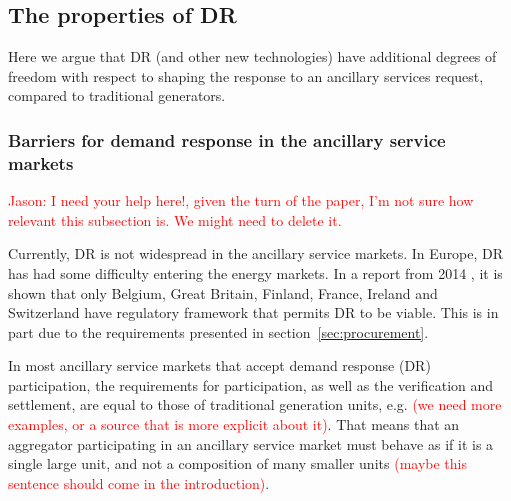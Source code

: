 
\subsection{The properties of DR}
Here we argue that DR (and other new technologies) have additional degrees of freedom with respect to shaping the response to an ancillary services request, compared to traditional generators.

\iffalse %

\subsubsection{Barriers for demand response in the ancillary service markets}\label{sec:drinasm}
\textcolor{red}{Jason: I need your help here!, given the turn of the paper, I'm not sure how relevant this subsection is. We might need to delete it.}

Currently, DR is not widespread in the ancillary service markets. In Europe, DR has had some difficulty entering the energy markets. In a report from 2014 \cite{sedc2014mapping}, it is shown that only Belgium, Great Britain, Finland, France, Ireland and Switzerland have regulatory framework that permits DR to be viable. This is in part due to the requirements presented in section~\ref{sec:procurement}.

In most ancillary service markets that accept demand response (DR) participation, the requirements for participation, as well as the verification and settlement, are equal to those of traditional generation units, e.g. \cite{energinet2012ancillary} \textcolor{red}{(we need more examples, or a source that is more explicit about it)}. That means that an aggregator participating in an ancillary service market must behave as if it is a single large unit, and not a composition of many smaller units \textcolor{red}{(maybe this sentence should come in the introduction)}. 

